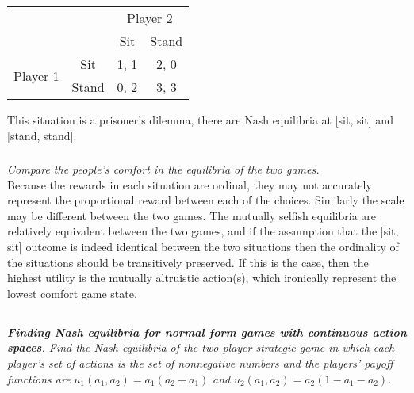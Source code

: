 \documentclass[12pt]{amsart}
\begin{document}
	\begin{center}
		\def\arraystretch{1.25}%
		\begin{tabular}{cccc}
			&                            & \multicolumn{2}{c}{Player 2}                           \\
			& \multicolumn{1}{c|}{}      & \multicolumn{1}{c|}{Sit}  & \multicolumn{1}{c|}{Stand} \\ \cline{2-4} 
			\multirow{2}{*}{Player 1} & \multicolumn{1}{c|}{Sit}   & \multicolumn{1}{c|}{1, 1} & \multicolumn{1}{c|}{2, 0}  \\ \cline{2-4} 
			& \multicolumn{1}{c|}{Stand} & \multicolumn{1}{c|}{0, 2} & \multicolumn{1}{c|}{3, 3}  \\ \cline{2-4} 
		\end{tabular}
	\end{center}
	
	This situation is a prisoner's dilemma, there are Nash equilibria at [sit, sit] and [stand, stand].
	
	\subsubsection{}
	\textit{Compare the people’s comfort in the equilibria of the two games.} \\

	Because the rewards in each situation are ordinal, they may not accurately represent the proportional
	reward between each of the choices. Similarly the scale may be different between the two games.
	The mutually selfish equilibria are relatively equivalent between the two games, 
	and if the assumption that the [sit, sit] outcome is indeed identical between the two situations
	then the ordinality of the situations should be transitively preserved.
	If this is the case, then the highest utility is the mutually altruistic action(s), which ironically
	represent the lowest comfort game state. \\

\subsection{}
\textit{\textbf{Finding Nash equilibria for normal form games with continuous action spaces}. 
	Find the Nash equilibria of the two-player strategic game in which each player’s set of actions is the
	set of nonnegative numbers and the players’ payoff functions are}
	$u_1(a_1,a_2) =a_1(a_2-a_1)$ \textit{and} $u_2(a_1,a_2) = a_2(1-a_1-a_2)$.
\end{document}
